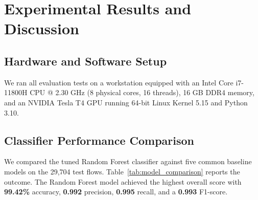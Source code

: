 \documentclass[conference]{IEEEtran}
\begin{document}
\section{Experimental Results and Discussion}

\subsection{Hardware and Software Setup}
We ran all evaluation tests on a workstation equipped with an Intel Core i7-11800H CPU @ 2.30 GHz (8 physical cores, 16 threads), 16 GB DDR4 memory, and an NVIDIA Tesla T4 GPU running 64-bit Linux Kernel 5.15 and Python 3.10.

\subsection{Classifier Performance Comparison}
We compared the tuned Random Forest classifier against five common baseline models on the 29,704 test flows. Table~\ref{tab:model_comparison} reports the outcome. The Random Forest model achieved the highest overall score with \textbf{99.42\%} accuracy, \textbf{0.992} precision, \textbf{0.995} recall, and a \textbf{0.993} F1-score.

\begin{table}[htbp]
\caption{Performance Comparison Across Different Classifiers}
\label{tab:model_comparison}
\centering
\small
{}
\end{table}
\end{document}
